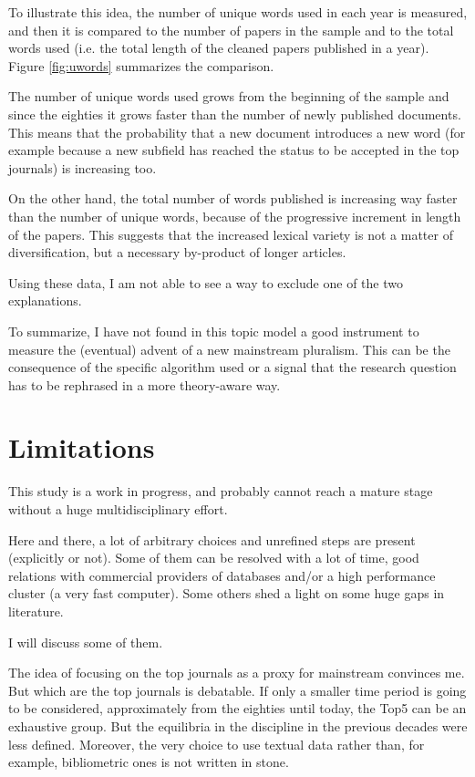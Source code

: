 \documentclass[a4paper, 11pt, headings=standardclasses, tablecaptionsbelow]{scrartcl}
\begin{document}
To illustrate this idea, the number of unique words used in each year is measured, and then it is compared to the number of papers in the sample and to the total words used (i.e. the total length of the cleaned papers published in a year). Figure \ref{fig:uwords} summarizes the comparison.

The number of unique words used grows from the beginning of the sample and since the eighties it grows faster than the number of newly published documents. This means that the probability that a new document introduces a new word (for example because a new subfield has reached the status to be accepted in the top journals) is increasing too.

On the other hand, the total number of words published is increasing way faster than the number of unique words, because of the progressive increment in length of the papers. This suggests that the increased lexical variety is not a matter of diversification, but a necessary by-product of longer articles.

Using these data, I am not able to see a way to exclude one of the two explanations.

To summarize, I have not found in this topic model a good instrument to measure the (eventual) advent of a new mainstream pluralism. This can be the consequence of the specific algorithm used or a signal that the research question has to be rephrased in a more theory-aware way.

\section{Limitations}
This study is a work in progress, and probably cannot reach a mature stage without a huge multidisciplinary effort.

Here and there, a lot of arbitrary choices and unrefined steps are present (explicitly or not).
Some of them can be resolved with a lot of time, good relations with commercial providers of databases and/or a high performance cluster (a very fast computer).
Some others shed a light on some huge gaps in literature.

I will discuss some of them.

The idea of focusing on the top journals as a proxy for mainstream convinces me. But which are the top journals is debatable.
If only a smaller time period is going to be considered, approximately from the eighties until today, the Top5 can be an exhaustive group. But the equilibria in the discipline in the previous decades were less defined.
Moreover, the very choice to use textual data rather than, for example, bibliometric ones is not written in stone.
\end{document}
